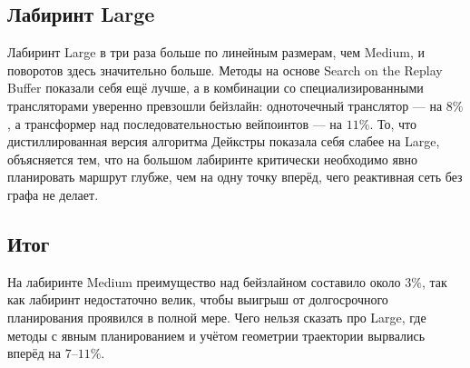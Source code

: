 \subsection{Лабиринт Large}
Лабиринт Large в три раза больше по линейным размерам, чем Medium, и поворотов здесь значительно больше. Методы на основе Search on the Replay Buffer показали себя ещё лучше, а в комбинации со специализированными трансляторами уверенно превзошли бейзлайн: одноточечный транслятор — на $8\%$, а трансформер над последовательностью вейпоинтов — на $11\%$. То, что дистиллированная версия алгоритма Дейкстры показала себя слабее на Large, объясняется тем, что на большом лабиринте критически необходимо явно планировать маршрут глубже, чем на одну точку вперёд, чего реактивная сеть без графа не делает.

\subsection{Итог}
На лабиринте Medium преимущество над бейзлайном составило около $3\%$, так как лабиринт недостаточно велик, чтобы выигрыш от долгосрочного планирования проявился в полной мере. Чего нельзя сказать про Large, где методы с явным планированием и учётом геометрии траектории вырвались вперёд на $7\text{--}11\%$.